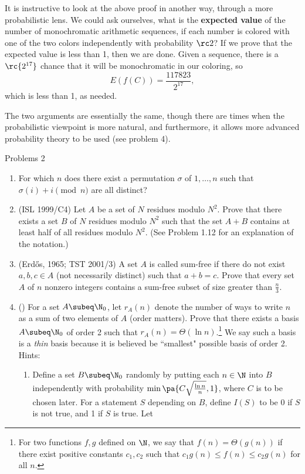 It is instructive to look at the above proof in another way, through a more probabilistic lens. We could ask ourselves, what is the \textbf{expected value} of the number of monochromatic arithmetic sequences, if each number is colored with one of the two colors independently with probability $\rc 2$? If we prove that the expected value is less than 1, then we are done. Given a sequence, there is a $\rc{2^{17}}$ chance that it will be monochromatic in our coloring, so
\[
E(f(C))=\frac{117823}{2^{17}},
\]
which is less than 1, as needed.

The two arguments are essentially the same, though there are times when the probabilistic viewpoint is more natural, and furthermore, it allows more advanced probability theory to be used (see problem 4).

{\Large Problems 2}
\begin{enumerate}
\item For which $n$ does there exist a permutation $\sigma$ of $1,\ldots, n$ such that $\sigma(i)+i\pmod n$ are all distinct?
\item (ISL 1999/C4) Let $A$ be a set of $N$ residues modulo $N^2$. Prove that there exists a set $B$ of $N$ residues modulo $N^2$ such that the set $A+B$ contains at least half of all residues modulo $N^2$. (See Problem 1.12 for an explanation of the notation.)
\item (Erd\H os, 1965; TST 2001/3)
A set $A$ is called sum-free if there do not exist $a,b,c\in A$ (not necessarily distinct) such that $a+b=c$. Prove that every set $A$ of $n$ nonzero integers contains a sum-free subset of size greater than $\frac{n}{3}$.
\item (\cite[\S1]{TV}) For a set $A\subeq \N_0$, let $r_A(n)$ denote the number of ways to write $n$ as a sum of two elements of $A$ (order matters). Prove that there exists a basis $A\subeq \N_0$ of order 2 such that $r_A(n)=\Theta(\ln n)$.\footnote{For two functions $f,g$ defined on $\N$, we say that $f(n)=\Theta(g(n))$ if there exist positive constants $c_1,c_2$ such that $c_1g(n)\leq f(n)\leq c_2g(n)$ for all $n$.} We say such a basis is a {\it thin} basis because it is believed be ``smallest" possible basis of order 2.
Hints: 
\begin{enumerate}
\item Define a set $B\subeq \N_0$ randomly by putting each $n\in \N$ into $B$ independently with probability $\min\pa{C\sqrt{\frac{\ln n}{n}},1}$, where $C$ is to be chosen later. For a statement $S$ depending on $B$, define $I(S)$ to be 0 if $S$ is not true, and 1 if $S$ is true. Let

\end{enumerate}
\end{enumerate}
